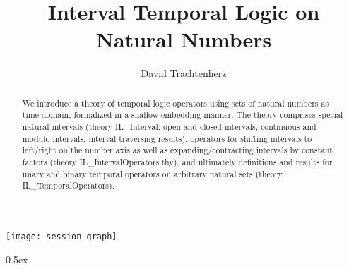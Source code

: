 \documentclass[11pt,a4paper]{article}
\begin{document}
\title{Interval Temporal Logic on Natural Numbers}
\author{David Trachtenherz}
\maketitle

\begin{abstract}
We introduce a theory of temporal logic operators using sets of
natural numbers as time domain, formalized in a shallow embedding
manner. The theory comprises special natural intervals (theory
IL\_Interval: open and closed intervals, continuous and modulo
intervals, interval traversing results), operators for shifting
intervals to left/right on the number axis as well as
expanding/contracting intervals by constant factors (theory
IL\_IntervalOperators.thy), and ultimately definitions and results for
unary and binary temporal operators on arbitrary natural sets (theory
IL\_TemporalOperators).
\end{abstract}

\tableofcontents

\begin{center}
  \texttt{[image: session\_graph]}
\end{center}

\clearpage

\parindent 0pt\parskip 0.5ex

\end{document}
